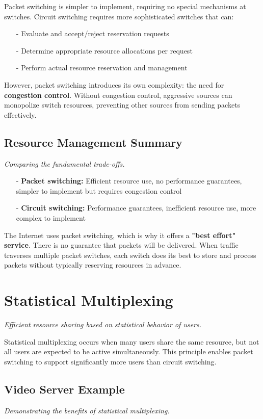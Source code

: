 \documentclass[../../compsys.tex]{subfiles}
\begin{document}
Packet switching is simpler to implement, requiring no special mechanisms at switches. Circuit switching requires more sophisticated switches that can:
\begin{itemize}
  \item[-] Evaluate and accept/reject reservation requests
  \item[-] Determine appropriate resource allocations per request
  \item[-] Perform actual resource reservation and management
\end{itemize}

However, packet switching introduces its own complexity: the need for \textbf{congestion control}. Without congestion control, aggressive sources can monopolize switch resources, preventing other sources from sending packets effectively.

\subsection{Resource Management Summary}
\textit{Comparing the fundamental trade-offs.}

\begin{itemize}
  \item[-] \textbf{Packet switching:} Efficient resource use, no performance guarantees, simpler to implement but requires congestion control
  \item[-] \textbf{Circuit switching:} Performance guarantees, inefficient resource use, more complex to implement
\end{itemize}

The Internet uses packet switching, which is why it offers a \textbf{"best effort" service}. There is no guarantee that packets will be delivered. When traffic traverses multiple packet switches, each switch does its best to store and process packets without typically reserving resources in advance.

\section{Statistical Multiplexing}
\textit{Efficient resource sharing based on statistical behavior of users.}

Statistical multiplexing occurs when many users share the same resource, but not all users are expected to be active simultaneously. This principle enables packet switching to support significantly more users than circuit switching.

\subsection{Video Server Example}
\textit{Demonstrating the benefits of statistical multiplexing.}
\end{document}

